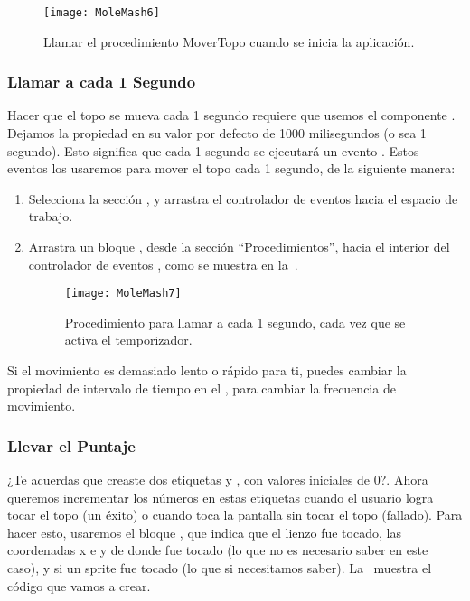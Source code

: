 {\begin{enumerate}
\begin{figure}[H]
\centering
\texttt{[image: MoleMash6]}
\caption{Llamar el procedimiento MoverTopo cuando se inicia la
aplicación.}
\label{fig:MoleMash6}
\end{figure}

\end{enumerate}


\subsubsection*{Llamar a  cada 1 Segundo}

Hacer que el topo se mueva cada 1 segundo requiere que usemos el
componente . Dejamos la propiedad
 en su valor por defecto de 1000
milisegundos (o sea 1 segundo). Esto significa que cada 1 segundo se
ejecutará un evento . Estos eventos los
usaremos para mover el topo cada 1 segundo, de la siguiente manera:

\begin{enumerate}

\item Selecciona la sección , y arrastra el
  controlador de eventos  hacia el espacio
  de trabajo.

\item Arrastra un bloque , desde la sección
  ``Procedimientos'', hacia el interior del controlador de eventos
  , como se muestra en
  la~.

\begin{figure}[H]
\centering
\texttt{[image: MoleMash7]}
\caption{Procedimiento para llamar a  cada 1
  segundo, cada vez que se activa el temporizador.}
\label{fig:MoleMash7}
\end{figure}

\end{enumerate}

Si el movimiento es demasiado lento o rápido para ti, puedes cambiar
la propiedad de intervalo de tiempo en el \designer, para cambiar la
frecuencia de movimiento.

\subsubsection*{Llevar el Puntaje}

¿Te acuerdas que creaste dos etiquetas
 y
, con valores iniciales de 0?. Ahora
queremos incrementar los números en estas etiquetas cuando el usuario
logra tocar el topo (un éxito) o cuando toca la pantalla sin tocar el
topo (fallado). Para hacer esto, usaremos el bloque
, que indica que el lienzo fue tocado, las
coordenadas x e y de donde fue tocado (lo que no es necesario saber en
este caso), y si un sprite fue tocado (lo que si necesitamos
saber). La~ muestra el código que vamos a crear.

}
